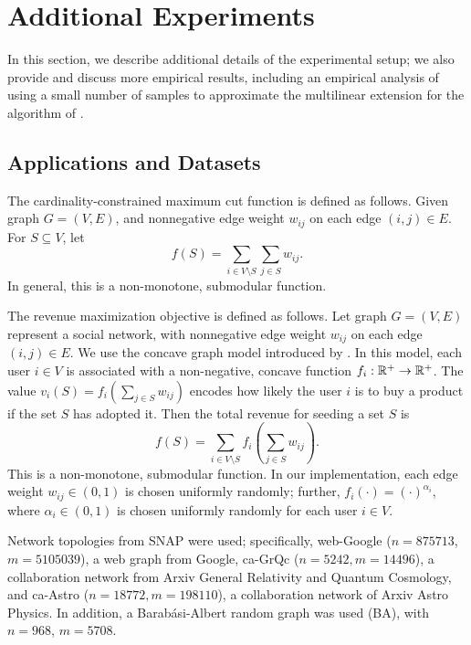 \section{Additional Experiments} \label{apx:exp}
In this section, we describe additional details of the experimental setup; we also
provide and discuss more empirical results, including an empirical analysis of using
a small number of samples to approximate the multilinear extension for the
algorithm of . 

\subsection{Applications and Datasets}
The cardinality-constrained maximum cut function is defined as follows.
Given graph $G = (V, E)$, and nonnegative edge weight $w_{ij}$ on each edge
$(i,j) \in E$. For $S \subseteq V$, let
$$f(S) = \sum_{i \in V \setminus S} \sum_{j \in S} w_{ij}.$$
In general, this is a non-monotone, submodular function. 

The revenue maximization objective is defined as follows.
Let graph $G = (V, E)$ represent a social network, 
with nonnegative edge weight $w_{ij}$ on each edge
$(i,j) \in E$.
We use the concave graph model introduced by .
In this model, each user $i \in V$ is associated with a non-negative,
concave function $f_i: \mathbb{R}^+ \to \mathbb{R}^+$. The value $v_i(S) = f_i( \sum_{j \in S} w_{ij} )$
encodes how likely the user $i$ is to buy a product if the set $S$ has adopted it.
Then the total revenue for seeding a set $S$ is 
$$f(S) = \sum_{i \in V \setminus S} f_i\left( \sum_{j \in S} w_{ij} \right).$$
This is a non-monotone, submodular function. In our implementation,
each edge weight $w_{ij} \in (0,1)$ is chosen uniformly randomly; further,
$f_i( \cdot ) = ( \cdot )^{\alpha_i}$, where $\alpha_i \in (0,1)$ is chosen
uniformly randomly for each user $i \in V$. 

Network topologies from SNAP were used; specifically,
web-Google ($n=875713$, $m = 5105039$), a web graph from
Google, ca-GrQc ($n = 5242, m = 14496$), a collaboration
network from Arxiv General Relativity and Quantum Cosmology,
and ca-Astro ($n = 18772, m = 198110$), a collaboration network
of Arxiv Astro Physics.
In addition, 
a Barabási-Albert random graph was used (BA), with $n = 968$, $m = 5708$.

